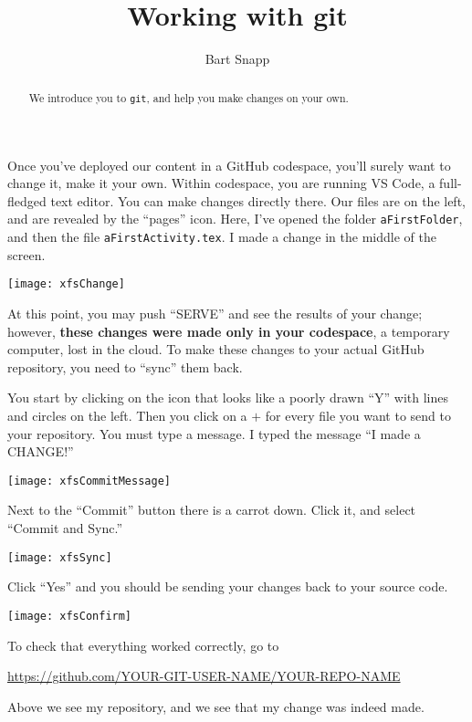 \documentclass{ximera}
\author{Bart Snapp}
\title{Working with git}
\begin{document}
\pdfOnly{\onecolumn}
\begin{abstract}
    We introduce you to \texttt{git}, and help you make changes on your own.
\end{abstract}
\maketitle

Once you've deployed our content in a GitHub codespace, you'll surely want to
change it, make it your own. Within codespace, you are running VS Code, a
full-fledged text editor. You can make changes directly there. Our files are on
the left, and are revealed by the ``pages'' icon.
Here, I've opened the folder \verb!aFirstFolder!, and then the file
\verb!aFirstActivity.tex!. I made a change in the middle of the screen.
\begin{image}
    \texttt{[image: xfsChange]}
\end{image}
At this point, you may push ``SERVE'' and see the results of your change;
however, \textbf{these changes were made only in your codespace}, a temporary
computer, lost in the cloud. To make these changes to your actual GitHub
repository, you need to ``sync'' them back.

\newpage

You start by clicking on the icon that looks like a poorly drawn ``Y'' with
lines and circles on the left. Then you click on a $+$ for every file you want
to send to your repository. You must type a message. I typed the message ``I
made a CHANGE!''
\begin{image}
    \texttt{[image: xfsCommitMessage]}
\end{image}

\newpage

Next to the ``Commit'' button there is a carrot down. Click it, and select
``Commit and Sync.''
\begin{image}
    \texttt{[image: xfsSync]}
\end{image}
Click ``Yes'' and you should be sending your changes back to your source code.

\newpage

\begin{image}
    \texttt{[image: xfsConfirm]}
\end{image}
To check that everything worked correctly, go to
\begin{center}
    \url{https://github.com/YOUR-GIT-USER-NAME/YOUR-REPO-NAME}
\end{center}
Above we see my repository, and we see that my change was indeed made.
\end{document}
